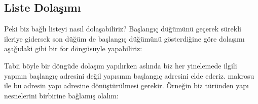 \documentclass[a4paper,10pt,turkish]{sphinxmanual}
\begin{document}
\begin{sphinxVerbatim}[commandchars=\\\{\}]
\end{sphinxVerbatim}


\subsection{Liste Dolaşımı}
\label{\detokenize{kernellinkedlistandhashtable:liste-dolasimi}}
\sphinxAtStartPar
Peki biz bağlı listeyi nasıl dolaşabiliriz? Başlangıç düğümünü geçerek sürekli ileriye gidersek son
düğüm de başlangıç düğümünü gösterdiğine göre dolaşımı aşağıdaki gibi bir for döngüsüyle yapabiliriz:

\begin{sphinxVerbatim}[commandchars=\\\{\}]

\end{sphinxVerbatim}

\sphinxAtStartPar
Tabii böyle bir döngüde dolaşım yapılırken aslında biz her yinelemede ilgili yapının başlangıç adresini
değil  yapısının başlangıç adresini elde ederiz.  makrosu ile bu adresin
yapı adresine dönüştürülmesi gerekir. Örneğin biz  türünden yapı nesnelerini birbirine
bağlamış olalım:
\end{document}
